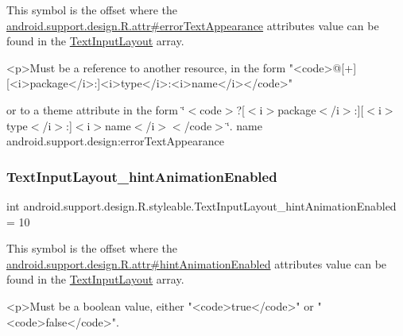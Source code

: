 This symbol is the offset where the \hyperlink{classandroid_1_1support_1_1design_1_1R_1_1attr_a605392532b4693396b9e2760d4cb8368}{android.\+support.\+design.\+R.\+attr\#error\+Text\+Appearance} attribute\textquotesingle{}s value can be found in the \hyperlink{classandroid_1_1support_1_1design_1_1R_1_1styleable_ae01fd2fce65dc8639f3898586b0cedcf}{Text\+Input\+Layout} array.

\begin{DoxyVerb}      <p>Must be a reference to another resource, in the form "<code>@[+][<i>package</i>:]<i>type</i>:<i>name</i></code>"
\end{DoxyVerb}
 or to a theme attribute in the form \char`\"{}$<$code$>$?\mbox{[}$<$i$>$package$<$/i$>$\+:\mbox{]}\mbox{[}$<$i$>$type$<$/i$>$\+:\mbox{]}$<$i$>$name$<$/i$>$$<$/code$>$\char`\"{}.  name android.\+support.\+design\+:error\+Text\+Appearance \mbox{\label{classandroid_1_1support_1_1design_1_1R_1_1styleable_a5bcfd0299af354869ae56b7577ec35e9}} 
\subsubsection{\texorpdfstring{Text\+Input\+Layout\+\_\+hint\+Animation\+Enabled}{TextInputLayout\_hintAnimationEnabled}}
{\footnotesize\ttfamily int android.\+support.\+design.\+R.\+styleable.\+Text\+Input\+Layout\+\_\+hint\+Animation\+Enabled = 10\hspace{0.3cm}{\ttfamily [static]}}

This symbol is the offset where the \hyperlink{classandroid_1_1support_1_1design_1_1R_1_1attr_a86d721c110a9ef2a63cf3b2d16ad9a50}{android.\+support.\+design.\+R.\+attr\#hint\+Animation\+Enabled} attribute\textquotesingle{}s value can be found in the \hyperlink{classandroid_1_1support_1_1design_1_1R_1_1styleable_ae01fd2fce65dc8639f3898586b0cedcf}{Text\+Input\+Layout} array.

\begin{DoxyVerb}      <p>Must be a boolean value, either "<code>true</code>" or "<code>false</code>".
\end{DoxyVerb}
 

